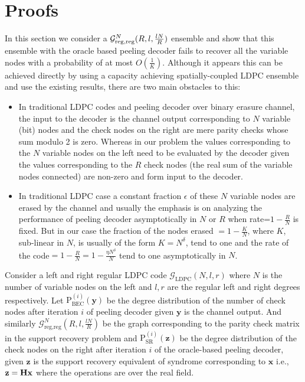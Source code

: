 \section{Proofs}
In this section we consider a $\mathcal{G}^{N}_{\rm reg,reg}(R,l,\frac{lN}{R})$ ensemble and show that this ensemble with the oracle based peeling decoder fails to recover all the variable nodes with a probability of at most $O\left(\frac{1}{K}\right)$. Although it appears this can be achieved directly by using a capacity achieving spatially-coupled LDPC ensemble and use the existing results, there are two main obstacles to this:
\begin{itemize}
\item  In traditional LDPC codes and peeling decoder over binary erasure channel, the input to the decoder is the channel output corresponding to $N$ variable (bit) nodes and the check nodes on the right are mere parity checks whose sum modulo 2 is zero. Whereas in our problem the values corresponding to the $N$ variable nodes on the left need to be evaluated by the decoder given the values corresponding to the $R$ check nodes (the real sum of the variable nodes connected) are non-zero  and form input to the decoder.
\item  In traditional LDPC case a constant fraction $\epsilon$ of these $N$ variable nodes are erased by the channel and usually the emphasis is on analyzing the performance of peeling decoder asymptotically in $N$ or $R$ when rate=$1-\frac{R}{N}$ is fixed. But in our case the fraction of the nodes erased $=1-\frac{K}{N}$, where $K$, sub-linear in $N$, is usually of the form $K=N^{\delta}$, tend to one and the rate of the code$=1-\frac{R}{N}=1-\frac{\eta N^{\delta}}{N}$ tend to one asymptotically in $N$.
\end{itemize}
\vspace{1ex}

Consider a left and right regular LDPC code $\mathcal{G}_{\text{LDPC}}(N,l,r)$ where $N$ is the number of variable nodes on the left and $l,r$ are the regular left and right degrees respectively. Let $\text{P}_{\text{BEC}}^{(i)}(\mathbf{y})$ be the degree distribution of the number of check nodes after iteration $i$ of peeling decoder given $\mathbf{y}$ is the channel output. And similarly $\mathcal{G}^{N}_{\text{reg,reg}}(R,l,\frac{lN}{R})$ be the graph corresponding to the parity check matrix in the support recovery problem and $\text{P}_{\text{SR}}^{(i)}(\mathbf{z})$ be the degree distribution of the check nodes on the right after iteration $i$ of the oracle-based peeling decoder, given $\mathbf{z}$ is the support recovery equivalent of syndrome corresponding to $\mathbf{x}$ i.e., $\mathbf{z}=\mathbf{H}\mathbf{x}$ where the operations are over the real field.

